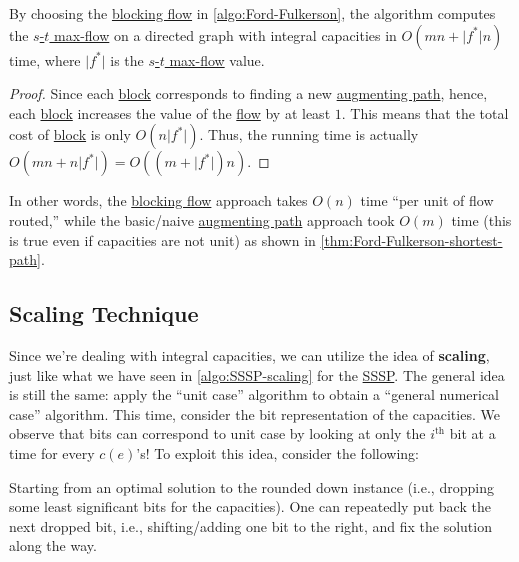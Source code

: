 \begin{corollary}\label{col:Ford-Fulkerson-blocking-flow-general}
	By choosing the \hyperref[def:blocking-flow]{blocking flow} in \autoref{algo:Ford-Fulkerson}, the algorithm computes the \hyperref[prb:s-t-max-flow]{\(s\)-\(t\) max-flow} on a directed graph with integral capacities in \(O(mn + \lvert f^{\ast} \rvert n)\) time, where \(\lvert f^{\ast} \rvert \) is the \hyperref[prb:s-t-max-flow]{\(s\)-\(t\) max-flow} value.
\end{corollary}
\begin{proof}
	Since each \hyperref[algo:adaptive-DFS-block]{block} corresponds to finding a new \hyperref[def:augmenting-path]{augmenting path}, hence, each \hyperref[algo:adaptive-DFS-block]{block} increases the value of the \hyperref[def:flow]{flow} by at least \(1\). This means that the total cost of \hyperref[algo:adaptive-DFS-block]{block} is only \(O(n \lvert f^{\ast} \rvert )\). Thus, the running time is actually \(O(mn + n \lvert f^{\ast} \rvert ) = O((m + \lvert f^{\ast} \rvert) n)\).
\end{proof}

In other words, the \hyperref[def:blocking-flow]{blocking flow} approach takes \(O(n)\) time ``per unit of flow routed,'' while the basic/naive \hyperref[def:augmenting-path]{augmenting path} approach took \(O(m)\) time (this is true even if capacities are not unit) as shown in \autoref{thm:Ford-Fulkerson-shortest-path}.

\subsection{Scaling Technique}
Since we're dealing with integral capacities, we can utilize the idea of \textbf{scaling}, just like what we have seen in \autoref{algo:SSSP-scaling} for the \hyperref[prb:SSSP]{SSSP}. The general idea is still the same: apply the ``unit case'' algorithm to obtain a ``general numerical case'' algorithm. This time, consider the bit representation of the capacities. We observe that bits can correspond to unit case by looking at only the \(i^{\text{th} }\) bit at a time for every \(c(e)\)'s! To exploit this idea, consider the following:

\begin{intuition}
	Starting from an optimal solution to the rounded down instance (i.e., dropping some least significant bits for the capacities). One can repeatedly put back the next dropped bit, i.e., shifting/adding one bit to the right, and fix the solution along the way.
\end{intuition}

